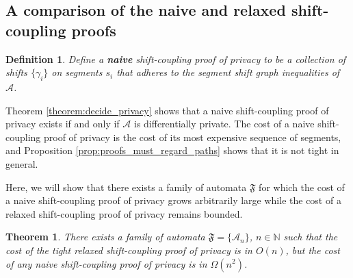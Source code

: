 \documentclass{article}
\newcommand{\N}{\mathbb{N}}
\newtheorem{theorem}{Theorem}
\newtheorem{definition}{Definition}[section]
\newcommand{\1}{\langle 1 \rangle}
\newcommand{\2}{\langle 2 \rangle}
\begin{document}
\subsection{A comparison of the naive and relaxed shift-coupling proofs}

\begin{definition}
    Define a \textbf{naive} shift-coupling proof of privacy to be a collection of shifts $\{\gamma_i\}$ on segments $s_i$ that adheres to the segment shift graph inequalities of $\mathcal{A}$.
\end{definition}

Theorem \ref{theorem:decide_privacy} shows that a naive shift-coupling proof of privacy exists if and only if $\mathcal{A}$ is differentially private. The cost of a naive shift-coupling proof of privacy is the cost of its most expensive sequence of segments, and Proposition \ref{prop:proofs_must_regard_paths} shows that it is not tight in general.

Here, we will show that there exists a family of automata $\mathfrak{F}$ for which the cost of a naive shift-coupling proof of privacy grows arbitrarily large while the cost of a relaxed shift-coupling proof of privacy remains bounded.

\begin{theorem}
    \label{theorem:naive_shifts_unbounded}
    There exists a family of automata $\mathfrak{F} = \{\mathcal{A}_n\}$, $n \in \N$ such that the cost of the tight relaxed shift-coupling proof of privacy is in $O(n)$, but the cost of any naive shift-coupling proof of privacy is in $\Omega(n^2)$.
\end{theorem}
\end{document}
